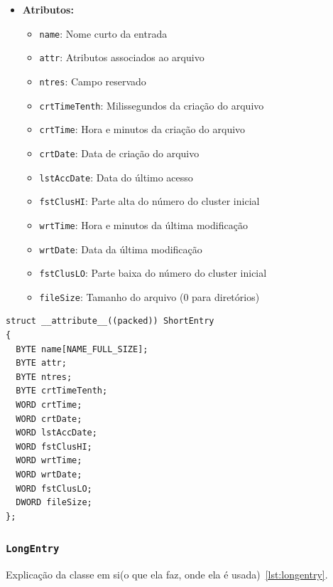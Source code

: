 \documentclass[
    12pt,				%
    oneside,   	        %
    a4paper,			%
    english,			%
    french,				%
    spanish,			%
    brazil,				%
    ]{pacotes/abntex2}
\begin{document}
\begin{itemize}
    \item \textbf{Atributos:}
        \begin{itemize}
            \item \texttt{name}: Nome curto da entrada
            \item \texttt{attr}: Atributos associados ao arquivo
            \item \texttt{ntres}: Campo reservado
            \item \texttt{crtTimeTenth}: Milissegundos da criação do arquivo
            \item \texttt{crtTime}: Hora e minutos da criação do arquivo
            \item \texttt{crtDate}: Data de criação do arquivo
            \item \texttt{lstAccDate}: Data do último acesso
            \item \texttt{fstClusHI}: Parte alta do número do cluster inicial
            \item \texttt{wrtTime}: Hora e minutos da última modificação
            \item \texttt{wrtDate}: Data da última modificação
            \item \texttt{fstClusLO}: Parte baixa do número do cluster inicial
            \item \texttt{fileSize}: Tamanho do arquivo (0 para diretórios)
        \end{itemize}
\end{itemize}

\begin{lstlisting}[caption={Estrutura que representa uma entrada curta no sistema de arquivos}, label={lst:shortentry}] 
struct __attribute__((packed)) ShortEntry
{
  BYTE name[NAME_FULL_SIZE];
  BYTE attr; 
  BYTE ntres;
  BYTE crtTimeTenth;
  WORD crtTime; 
  WORD crtDate; 
  WORD lstAccDate;
  WORD fstClusHI; 
  WORD wrtTime;
  WORD wrtDate;
  WORD fstClusLO;
  DWORD fileSize;
};
\end{lstlisting}

\subsubsection{\texttt{LongEntry}}
\label{subsubsec:long_entry}

Explicação da classe em si(o que ela faz, onde ela é usada)~\ref{lst:longentry}.
\end{document}
